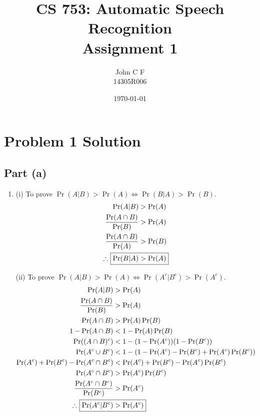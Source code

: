 \documentclass[11pt,a4paper,titlepage]{article}
\title{\blue CS 753: Automatic Speech Recognition \\ \blueb Assignment 1}
\author{John C F \\ \small 14305R006}
\date{\today}
\begin{document}
\maketitle
\newpage


\section*{Problem 1 Solution}
\subsection*{Part (a)}

\addtolength{\jot}{0.25em}
\begin{enumerate}
    \item (i) To prove $\Pr(A | B) > \Pr(A) \iff \Pr(B | A) > \Pr(B)$.
        \begin{align*}
            \Pr(A | B) &> \Pr(A) \\
            \frac{\Pr(A \cap B)}{\Pr(B)} &> \Pr(A) \\
            \frac{\Pr(A \cap B)}{\Pr(A)} &> \Pr(B) \\
            \therefore~\Aboxed{\Pr(B | A) &> \Pr(A)}
        \end{align*}

        (ii) To prove $\Pr(A | B) > \Pr(A) \iff \Pr(A^c | B^c) > \Pr(A^c)$.
        \begin{align*}
            \Pr(A | B) &> \Pr(A) \\
            \frac{\Pr(A \cap B)}{\Pr(B)} &> \Pr(A) \\
            \Pr(A \cap B) &> \Pr(A) \Pr(B) \\
            1 - \Pr(A \cap B) &< 1 - \Pr(A) \Pr(B) \\
            \Pr((A \cap B)^c) &< 1 - (1 - \Pr(A^c)) (1 - \Pr(B^c)) \\
            \Pr(A^c \cup B^c) &< 1 - (1 - \Pr(A^c) - \Pr(B^c) + \Pr(A^c) \Pr(B^c)) \\
            \Pr(A^c) + \Pr(B^c) - \Pr(A^c \cap B^c) &< \Pr(A^c) + \Pr(B^c) - \Pr(A^c) \Pr(B^c) \\
            \Pr(A^c \cap B^c) &> \Pr(A^c) \Pr(B^c) \\
            \frac{\Pr(A^c \cap B^c)}{\Pr(B^c)} &> \Pr(A^c) \\
            \therefore~\Aboxed{\Pr(A^c | B^c) &> \Pr(A^c)}
        \end{align*}


\end{enumerate}
\end{document}
